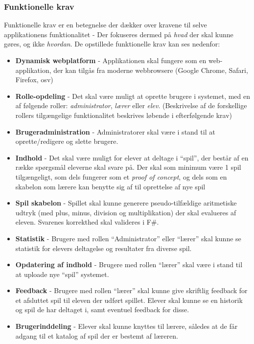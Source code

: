 \documentclass[12pt, a4paper]{article}
\begin{document}
\subsubsection{Funktionelle krav}
Funktionelle krav er en betegnelse der dækker over kravene til selve applikationens funktionalitet - Der fokuseres dermed på \emph{hvad} der skal kunne gøres, og ikke \emph{hvordan}. De opstillede funktionelle krav kan ses nedenfor:
\begin{itemize}
  \item \textbf{Dynamisk webplatform} - Applikationen skal fungere som en web-applikation, der kan tilgås fra moderne webbrowsere (Google Chrome, Safari, Firefox, osv)
  \item \textbf{Rolle-opdeling} - Det skal være muligt at oprette brugere i systemet, med en af følgende roller: \emph{administrator}, \emph{lærer} eller \emph{elev}. (Beskrivelse af de forskellige rollers tilgængelige funktionalitet beskrives løbende i efterfølgende krav)
  \item \textbf{Brugeradministration} - Administratorer skal være i stand til at oprette/redigere og slette brugere.
  \item \textbf{Indhold} - Det skal være muligt for elever at deltage i ``spil'', der består af en række spørgsmål eleverne skal svare på. Der skal som minimum være 1 spil tilgængeligt, som dels fungerer som et \emph{proof of concept}, og dels som en skabelon som lærere kan benytte sig af til oprettelse af nye spil
  \item \textbf{Spil skabelon} - Spillet skal kunne generere pseudo-tilfældige aritmetiske udtryk (med plus, minus, division og multiplikation) der skal evalueres af eleven. Svarenes korrekthed skal valideres i F\#.
  \item \textbf{Statistik} - Brugere med rollen ``Administrator'' eller ``lærer'' skal kunne se statistik for elevers deltagelse og resultater fra diverse spil.
  \item \textbf{Opdatering af indhold} - Brugere med rollen ``lærer'' skal være i stand til at uploade nye ``spil'' systemet.
  \item \textbf{Feedback} - Brugere med rollen ``lærer'' skal kunne give skriftlig feedback for et afsluttet spil til eleven der udført spillet. Elever skal kunne se en historik og spil de har deltaget i, samt eventuel feedback for disse.
  \item \textbf{Brugerinddeling} - Elever skal kunne knyttes til lærere, således at de får adgang til et katalog af spil der er bestemt af læreren.
\end{itemize}
\end{document}
